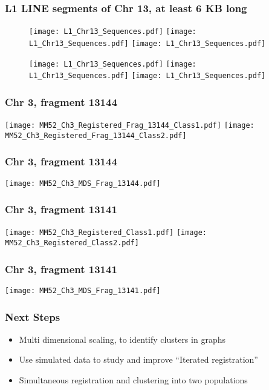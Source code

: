 \documentclass[10pt,dvipsnames,table]{beamer}
\begin{document}
\begin{frame}
\frametitle{L1 LINE segments of Chr 13, at least 6 KB long}
\begin{figure}
\centering
\texttt{[image: L1\_Chr13\_Sequences.pdf]}
\texttt{[image: L1\_Chr13\_Sequences.pdf]} 
\texttt{[image: L1\_Chr13\_Sequences.pdf]} 
\end{figure}
\begin{figure}
\texttt{[image: L1\_Chr13\_Sequences.pdf]} 
\texttt{[image: L1\_Chr13\_Sequences.pdf]}
\texttt{[image: L1\_Chr13\_Sequences.pdf]} 
\end{figure}
\end{frame}

\begin{frame}
\frametitle{Chr 3, fragment 13144 }
\begin{center}
\texttt{[image: MM52\_Ch3\_Registered\_Frag\_13144\_Class1.pdf]} 
\texttt{[image: MM52\_Ch3\_Registered\_Frag\_13144\_Class2.pdf]} 
\end{center}
\end{frame}

\begin{frame}
\frametitle{Chr 3, fragment 13144 }
\begin{center}
\texttt{[image: MM52\_Ch3\_MDS\_Frag\_13144.pdf]} 
\end{center}
\end{frame}

\begin{frame}
\frametitle{Chr 3, fragment 13141 }
\begin{center}
\texttt{[image: MM52\_Ch3\_Registered\_Class1.pdf]} 
\texttt{[image: MM52\_Ch3\_Registered\_Class2.pdf]} 
\end{center}
\end{frame}

\begin{frame}
\frametitle{Chr 3, fragment 13141 }
\begin{center}
\texttt{[image: MM52\_Ch3\_MDS\_Frag\_13141.pdf]} 
\end{center}
\end{frame}


\begin{frame}
\frametitle{Next Steps}
\begin{itemize}
\pause \item Multi dimensional scaling, to identify clusters in graphs
\pause \item Use simulated data to study and improve ``Iterated registration''
\pause \item Simultaneous registration and clustering into two populations
\end{itemize}
\end{frame}
\end{document}
